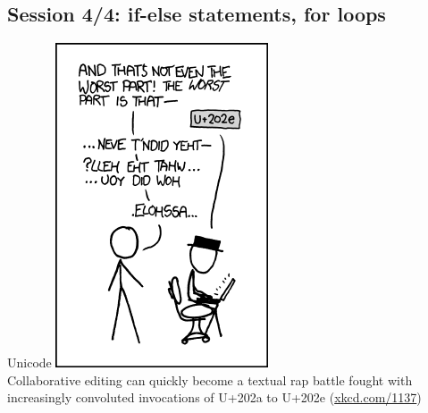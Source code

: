 \documentclass[xcolor=table,       handout,    xcolor=dvipsnames]{beamer}\usepackage[]{graphicx}\usepackage[]{color}
\begin{document}


\subsection{Session 4/4: if-else statements, for loops}

\begin{frame}{Unicode}
\center \includegraphics[height=0.65\textheight]{externalfig/rtl.png}\\
Collaborative editing can quickly become a textual rap battle fought with increasingly convoluted invocations of U+202a to U+202e (\href{https://xkcd.com/1137/}{xkcd.com/1137})
\end{frame}

\end{document}
